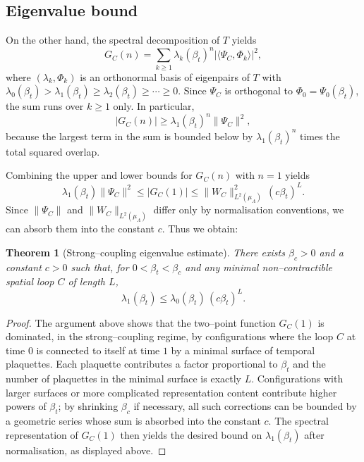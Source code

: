 \documentclass[11pt]{article}
\newtheorem{theorem}{Theorem}[section]
\begin{document}
\subsection{Eigenvalue bound}

On the other hand, the spectral decomposition of $T$ yields
\begin{equation}
  G_C(n) = \sum_{k\ge 1} \lambda_k(\beta_t)^n
    |\langle\Psi_C,\Phi_k\rangle|^2,
\end{equation}
where $(\lambda_k,\Phi_k)$ is an orthonormal basis of eigenpairs of $T$
with $\lambda_0(\beta_t)>\lambda_1(\beta_t)\ge\lambda_2(\beta_t)\ge\cdots\ge 0$.
Since $\Psi_C$ is orthogonal to $\Phi_0=\Psi_0(\beta_t)$, the sum runs
over $k\ge 1$ only.  In particular,
\begin{equation}
  |G_C(n)| \ge \lambda_1(\beta_t)^n \|\Psi_C\|^2,
\end{equation}
because the largest term in the sum is bounded below by
$\lambda_1(\beta_t)^n$ times the total squared overlap.

Combining the upper and lower bounds for $G_C(n)$ with $n=1$ yields
\begin{equation}
  \lambda_1(\beta_t)\|\Psi_C\|^2
  \le |G_C(1)|
  \le \|W_C\|_{L^2(\mu_\Lambda)}^2\,(c\beta_t)^L.
\end{equation}
Since $\|\Psi_C\|$ and $\|W_C\|_{L^2(\mu_\Lambda)}$ differ only by
normalisation conventions, we can absorb them into the constant $c$.
Thus we obtain:

\begin{theorem}[Strong--coupling eigenvalue estimate]
\label{thm:loop-eigenvalue}
There exists $\beta_c>0$ and a constant $c>0$ such that, for
$0<\beta_t<\beta_c$ and any minimal non--contractible spatial loop $C$
of length $L$,
\begin{equation}
  \lambda_1(\beta_t)
  \le \lambda_0(\beta_t)\,(c\beta_t)^L.
\end{equation}
\end{theorem}

\begin{proof}
The argument above shows that the two--point function $G_C(1)$ is
dominated, in the strong--coupling regime, by configurations where the
loop $C$ at time $0$ is connected to itself at time $1$ by a minimal
surface of temporal plaquettes.  Each plaquette contributes a factor
proportional to $\beta_t$ and the number of plaquettes in the minimal
surface is exactly $L$.  Configurations with larger surfaces or more
complicated representation content contribute higher powers of
$\beta_t$; by shrinking $\beta_c$ if necessary, all such corrections can
be bounded by a geometric series whose sum is absorbed into the constant
$c$.  The spectral representation of $G_C(1)$ then yields the desired
bound on $\lambda_1(\beta_t)$ after normalisation, as displayed above.
\end{proof}
\end{document}
